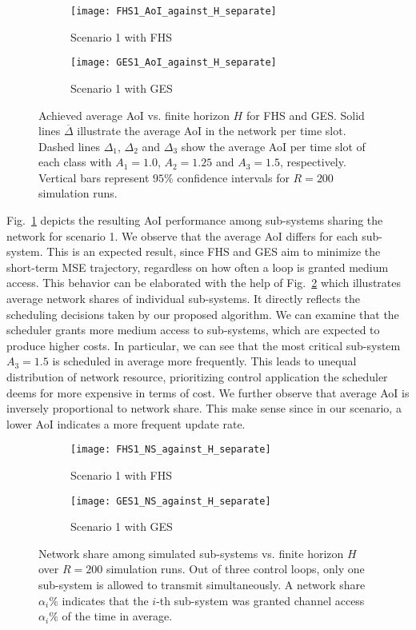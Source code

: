 \begin{figure}[htb]
  \centering
  \begin{subfigure}{0.49\textwidth}
    \centering
    \texttt{[image: FHS1\_AoI\_against\_H\_separate]}
    \caption{Scenario 1 with FHS}
  \end{subfigure}
  \hfill
  \begin{subfigure}{0.49\textwidth}
    \centering
    \texttt{[image: GES1\_AoI\_against\_H\_separate]}
    \caption{Scenario 1 with GES}
  \end{subfigure}
\caption[Scenario 1: Average AoI vs. finite horizon $H$]{Achieved average AoI
vs. finite horizon $H$ for FHS and GES. Solid lines $\overline{\Delta}$
illustrate the average AoI in the network per time slot. Dashed lines
$\Delta_1$, $\Delta_2$ and $\Delta_3$ show the average AoI per time slot of each
class with $A_1 = 1.0$, $A_2=1.25$ and $A_3=1.5$, respectively. Vertical bars
represent $95\%$ confidence intervals for $R=200$ simulation runs.}
\label{fig:AoIseperate}
\end{figure}

Fig.~\ref{fig:AoIseperate} depicts the resulting AoI performance among
sub-systems sharing the network for scenario 1. We observe that the average AoI
differs for each sub-system. This is an expected result, since FHS and GES aim
to minimize the short-term MSE trajectory, regardless on how often a loop is
granted medium access. This behavior can be elaborated with the help of
Fig.~\ref{fig:networkshare} which illustrates average network shares of
individual sub-systems. It directly reflects the scheduling decisions taken by
our proposed algorithm. We can examine that the scheduler grants more medium
access to sub-systems, which are expected to produce higher costs. In
particular, we can see that the most critical sub-system $A_3 = 1.5$ is
scheduled in average more frequently. This leads to unequal distribution of
network resource, prioritizing control application the scheduler deems for more
expensive in terms of cost. We further observe that average AoI is inversely
proportional to network share. This make sense since in our scenario, a lower
AoI indicates a more frequent update rate. 

\begin{figure}[p]
\centering
\begin{subfigure}{0.49\textwidth}
  \centering
  \texttt{[image: FHS1\_NS\_against\_H\_separate]}
  \caption{Scenario 1 with FHS}
\end{subfigure}
\hfill
\begin{subfigure}{0.49\textwidth}
  \centering
  \texttt{[image: GES1\_NS\_against\_H\_separate]}
  \caption{Scenario 1 with GES}
\end{subfigure}
  \caption[Scenario 1: Network share among heterogenous subsystems vs. finite
  horizon $H$]{Network share among simulated sub-systems vs. finite horizon $H$
  over $R=200$ simulation runs. Out of three control loops, only one sub-system
  is allowed to transmit simultaneously. A network share $\alpha_i\%$ indicates
  that the $i$-th sub-system was granted channel access $\alpha_i\%$ of the time
  in average.} 
  \label{fig:networkshare}
\end{figure}

